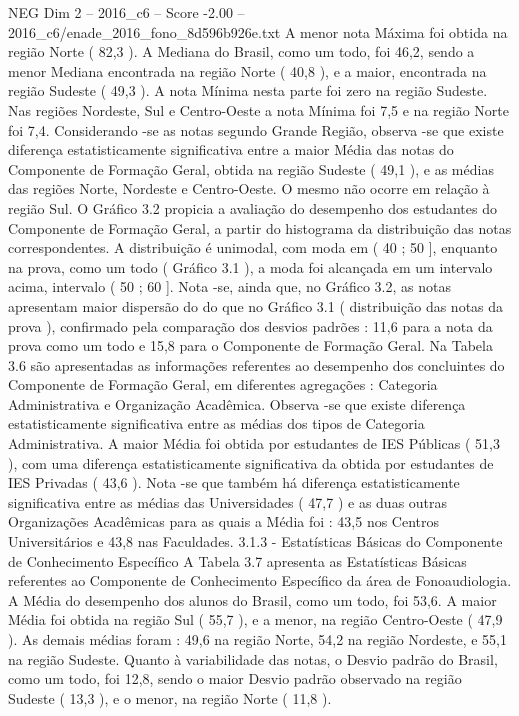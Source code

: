 \begin{textsample}{NEG Dim 2 – 2016\_c6 – Score -2.00 – 2016\_c6/enade\_2016\_fono\_8d596b926e.txt}
A menor nota Máxima foi obtida na região Norte ( 82,3 ).
A Mediana do Brasil, como um todo, foi 46,2, sendo a menor Mediana encontrada na região Norte ( 40,8 ), e a maior, encontrada na região Sudeste ( 49,3 ).
A nota Mínima nesta parte foi zero na região Sudeste.
Nas regiões Nordeste, Sul e Centro-Oeste a nota Mínima foi 7,5 e na região Norte foi 7,4.
Considerando -se as notas segundo Grande Região, observa -se que existe diferença estatisticamente significativa entre a maior Média das notas do Componente de Formação Geral, obtida na região Sudeste ( 49,1 ), e as médias das regiões Norte, Nordeste e Centro-Oeste.
O mesmo não ocorre em relação à região Sul.
O Gráfico 3.2 propicia a avaliação do desempenho dos estudantes do Componente de Formação Geral, a partir do histograma da distribuição das notas correspondentes.
A distribuição é unimodal, com moda em ( 40 ; 50 ], enquanto na prova, como um todo ( Gráfico 3.1 ), a moda foi alcançada em um intervalo acima, intervalo ( 50 ; 60 ].
Nota -se, ainda que, no Gráfico 3.2, as notas apresentam maior dispersão do do que no Gráfico 3.1 ( distribuição das notas da prova ), confirmado pela comparação dos desvios padrões : 11,6 para a nota da prova como um todo e 15,8 para o Componente de Formação Geral.
Na Tabela 3.6 são apresentadas as informações referentes ao desempenho dos concluintes do Componente de Formação Geral, em diferentes agregações : Categoria Administrativa e Organização Acadêmica.
Observa -se que existe diferença estatisticamente significativa entre as médias dos tipos de Categoria Administrativa.
A maior Média foi obtida por estudantes de IES Públicas ( 51,3 ), com uma diferença estatisticamente significativa da obtida por estudantes de IES Privadas ( 43,6 ).
Nota -se que também há diferença estatisticamente significativa entre as médias das Universidades ( 47,7 ) e as duas outras Organizações Acadêmicas para as quais a Média foi : 43,5 nos Centros Universitários e 43,8 nas Faculdades. 3.1.3 - Estatísticas Básicas do Componente de Conhecimento Específico A Tabela 3.7 apresenta as Estatísticas Básicas referentes ao Componente de Conhecimento Específico da área de Fonoaudiologia.
A Média do desempenho dos alunos do Brasil, como um todo, foi 53,6.
A maior Média foi obtida na região Sul ( 55,7 ), e a menor, na região Centro-Oeste ( 47,9 ).
As demais médias foram : 49,6 na região Norte, 54,2 na região Nordeste, e 55,1 na região Sudeste.
Quanto à variabilidade das notas, o Desvio padrão do Brasil, como um todo, foi 12,8, sendo o maior Desvio padrão observado na região Sudeste ( 13,3 ), e o menor, na região Norte ( 11,8 ).

\end{textsample}
